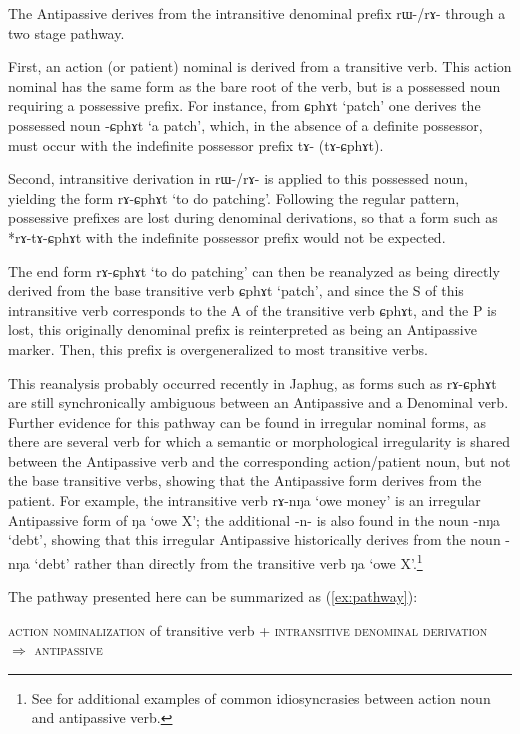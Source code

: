 \documentclass[oldfontcommands,oneside,a4paper,11pt]{article}
\newcommand{\ipa}[1]{\mbox{\phon #1}} %
\begin{document}
The Antipassive derives from the intransitive denominal prefix \ipa{rɯ-/rɤ-} through a two stage pathway.

First, an action (or patient) nominal is derived from a transitive verb. This action nominal has the same form as the bare root of the verb, but is a possessed noun requiring a possessive prefix. For instance, from \ipa{ɕphɤt} `patch' one derives the possessed noun 
\ipa{-ɕphɤt} `a patch', which, in the absence of a definite possessor, must occur with the indefinite possessor prefix \ipa{tɤ-} (\ipa{tɤ-ɕphɤt}).

Second, intransitive derivation in \ipa{rɯ-/rɤ-} is applied to this possessed noun, yielding the form \ipa{rɤ-ɕphɤt} `to do patching'. Following the regular pattern, possessive prefixes are lost during denominal derivations, so that a form such as *\ipa{rɤ-tɤ-ɕphɤt} with the indefinite possessor prefix would not be expected.

The end form \ipa{rɤ-ɕphɤt} `to do patching' can then be reanalyzed as being directly derived from the base transitive verb \ipa{ɕphɤt} `patch', and since the S of this intransitive verb corresponds to the A of the transitive verb \ipa{ɕphɤt}, and the P is lost, this originally denominal prefix is reinterpreted as being an Antipassive marker. Then, this prefix is overgeneralized to most transitive verbs.

This reanalysis probably occurred recently in Japhug, as forms such as \ipa{rɤ-ɕphɤt} are still synchronically ambiguous between an Antipassive and a Denominal verb. Further evidence for this pathway can be found in irregular nominal forms, as there are several verb for which a semantic or morphological irregularity is shared between the Antipassive verb and the corresponding action/patient noun, but not the base transitive verbs, showing that the Antipassive form derives from the patient. For example, the intransitive verb \ipa{rɤ-nŋa} `owe money' is an irregular Antipassive form of \ipa{ŋa} `owe X'; the additional \ipa{-n-} is also found in the noun \ipa{-nŋa} `debt', showing that this irregular Antipassive historically derives from the noun \ipa{-nŋa} `debt' rather than directly from the transitive verb \ipa{ŋa} `owe X'.\footnote{See \citet{jacques14antipassive} for additional examples of common idiosyncrasies between action noun and antipassive verb.}

The pathway presented here can be summarized as (\ref{ex:pathway}):

\begin{exe}
\ex \label{ex:pathway}
\glt \textsc{action nominalization} of transitive verb + \textsc{intransitive denominal derivation} $\Rightarrow$ \textsc{antipassive}
\end{exe}
\end{document}
